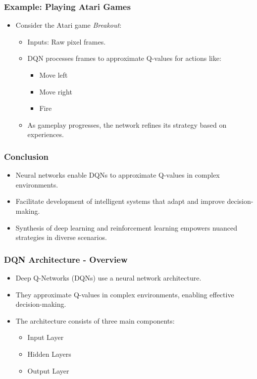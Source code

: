 \documentclass[aspectratio=169]{beamer}
\begin{document}
\begin{frame}[fragile]
    \frametitle{Example: Playing Atari Games}
    \begin{itemize}
        \item Consider the Atari game \textit{Breakout}:
        \begin{itemize}
            \item Inputs: Raw pixel frames.
            \item DQN processes frames to approximate Q-values for actions like:
            \begin{itemize}
                \item Move left
                \item Move right
                \item Fire
            \end{itemize}
            \item As gameplay progresses, the network refines its strategy based on experiences.
        \end{itemize}
    \end{itemize}
\end{frame}

\begin{frame}[fragile]
    \frametitle{Conclusion}
    \begin{itemize}
        \item Neural networks enable DQNs to approximate Q-values in complex environments.
        \item Facilitate development of intelligent systems that adapt and improve decision-making.
        \item Synthesis of deep learning and reinforcement learning empowers nuanced strategies in diverse scenarios.
    \end{itemize}
\end{frame}

\begin{frame}[fragile]
    \frametitle{DQN Architecture - Overview}
    \begin{itemize}
        \item Deep Q-Networks (DQNs) use a neural network architecture.
        \item They approximate Q-values in complex environments, enabling effective decision-making.
        \item The architecture consists of three main components:
        \begin{itemize}
            \item Input Layer
            \item Hidden Layers
            \item Output Layer
        \end{itemize}
    \end{itemize}
\end{frame}
\end{document}
